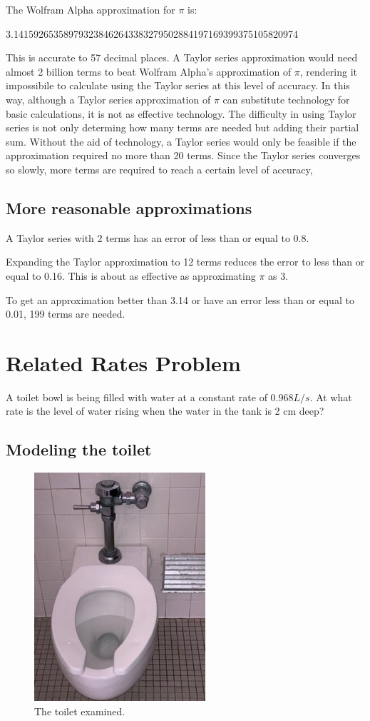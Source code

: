 \documentclass[12pt, titlepage]{article}
\begin{document}
The Wolfram Alpha approximation for \(\pi\) is:

3.141592653589793238462643383279502884197169399375105820974

This is accurate to 57 decimal places. A Taylor series approximation would need almost 2 billion terms to beat Wolfram Alpha's approximation of \(\pi\), rendering it impossibile to calculate using the Taylor series at this level of accuracy. In this way, although a Taylor series approximation of \(\pi\) can substitute technology for basic calculations, it is not as effective technology. The difficulty in using Taylor series is not only determing how many terms are needed but adding their partial sum. Without the aid of technology, a Taylor series would only be feasible if the approximation required no more than 20 terms. Since the Taylor series converges so slowly, more terms are required to reach a certain level of accuracy,

\subsection{More reasonable approximations}
A Taylor series with 2 terms has an error of less than or equal to 0.8.

Expanding the Taylor approximation to 12 terms reduces the error to less than or equal to 0.16. This is about as effective as approximating \(\pi\) as 3.

To get an approximation better than 3.14 or have an error less than or equal to 0.01, 199 terms are needed. 

\section{Related Rates Problem}
A toilet bowl is being filled with water at a constant rate of \(0.968 L/s\). At what rate is the level of water rising when the water in the tank is 2 cm deep?

\subsection{Modeling the toilet}
\begin{figure}[H]
\centering
  \includegraphics[angle=270]{toilet.jpeg}
    \caption{The toilet examined.}
\end{figure}
\end{document}
